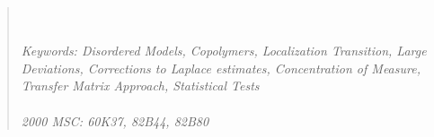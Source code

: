 \documentclass[reqno,11pt]{amsart}
\numberwithin{equation}{section}
\begin{document}
\begin{abstract}
\\
\\
\textit{Keywords: Disordered Models, Copolymers, Localization Transition,  Large Deviations, Corrections to Laplace estimates, Concentration of Measure, Transfer Matrix Approach, Statistical Tests}
\\
\\
\textit{2000 MSC: 60K37, 82B44, 82B80}
\end{abstract}



\maketitle



\end{document}
